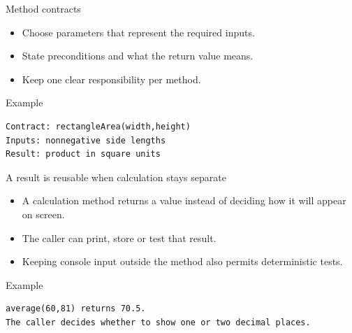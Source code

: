 \documentclass[10pt,aspectratio=169]{beamer}
\begin{document}
\begin{frame}[fragile,t]{Method contracts}
\begin{itemize}
\item Choose parameters that represent the required inputs.
\item State preconditions and what the return value means.
\item Keep one clear responsibility per method.
\end{itemize}
\vspace{1mm}\begin{block}{Example}
\begin{lstlisting}
Contract: rectangleArea(width,height)
Inputs: nonnegative side lengths
Result: product in square units
\end{lstlisting}
\end{block}
\end{frame}

\begin{frame}[fragile,t]{A result is reusable when calculation stays separate}
\begin{itemize}
\item A calculation method returns a value instead of deciding how it will appear on screen.
\item The caller can print, store or test that result.
\item Keeping console input outside the method also permits deterministic tests.
\end{itemize}
\vspace{1mm}\begin{block}{Example}
\begin{lstlisting}
average(60,81) returns 70.5.
The caller decides whether to show one or two decimal places.
\end{lstlisting}
\end{block}
\end{frame}
\end{document}
